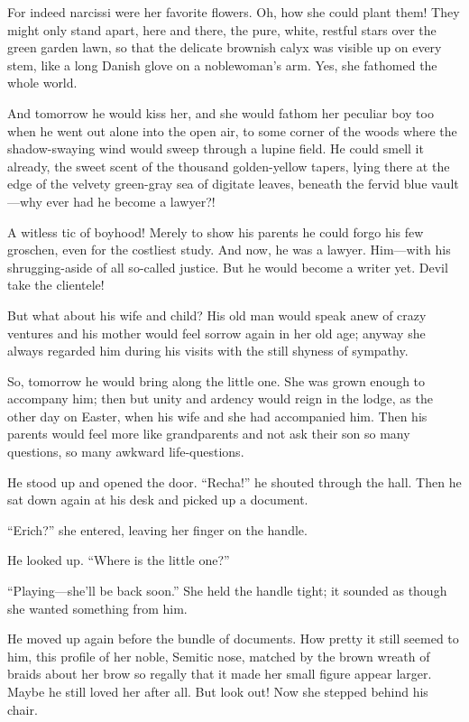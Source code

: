 \documentclass[12pt,a4paper]{article}
\begin{document}
For indeed narcissi were her favorite flowers. Oh, how she could plant them! They might only stand apart, here and there, the pure, white, restful stars over the green garden lawn, so that the delicate brownish calyx was visible up on every stem, like a long Danish glove on a noblewoman’s arm. Yes, she fathomed the whole world.

And tomorrow he would kiss her, and she would fathom her peculiar boy too when he went out alone into the open air, to some corner of the woods where the shadow-swaying wind would sweep through a lupine field. He could smell it already, the sweet scent of the thousand golden-yellow tapers, lying there at the edge of the velvety green-gray sea of digitate leaves, beneath the fervid blue vault—why ever had he become a lawyer?!

A witless tic of boyhood! Merely to show his parents he could forgo his few groschen, even for the costliest study. And now, he was a lawyer. Him—with his shrugging-aside of all so-called justice. But he would become a writer yet. Devil take the clientele!

But what about his wife and child? His old man would speak anew of crazy ventures and his mother would feel sorrow again in her old age; anyway she always regarded him during his visits with the still shyness of sympathy.

So, tomorrow he would bring along the little one. She was grown enough to accompany him; then but unity and ardency would reign in the lodge, as the other day on Easter, when his wife and she had accompanied him. Then his parents would feel more like grandparents and not ask their son so many questions, so many awkward life-questions.

He stood up and opened the door. “Recha!” he shouted through the hall. Then he sat down again at his desk and picked up a document.

“Erich?” she entered, leaving her finger on the handle.

He looked up. “Where is the little one?”

“Playing—she’ll be back soon.” She held the handle tight; it sounded as though she wanted something from him.

He moved up again before the bundle of documents. How pretty it still seemed to him, this profile of her noble, Semitic nose, matched by the brown wreath of braids about her brow so regally that it made her small figure appear larger. Maybe he still loved her after all. But look out! Now she stepped behind his chair.
\end{document}
